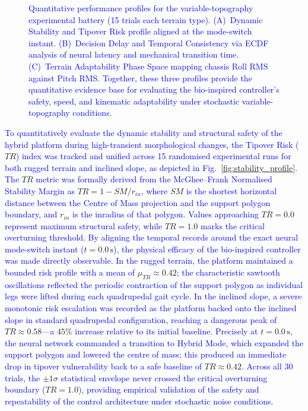 \documentclass[preprint,12pt]{elsarticle}
\newcommand{\revblue}[1]{\textcolor{blue}{#1}}
\begin{document}
\begin{figure}[t]
\begin{subfigure}[t]{0.32\textwidth}
        \label{fig:terrain_adaptability}
    \end{subfigure}
    \caption{\revblue{Quantitative performance profiles for the variable-topography experimental battery (15 trials each terrain type). (A)~Dynamic Stability and Tipover Risk profile aligned at the mode-switch instant. (B)~Decision Delay and Temporal Consistency via ECDF analysis of neural latency and mechanical transition time. (C)~Terrain Adaptability Phase Space mapping chassis Roll RMS against Pitch RMS. Together, these three profiles provide the quantitative evidence base for evaluating the bio-inspired controller's safety, speed, and kinematic adaptability under stochastic variable-topography conditions.}}
    \label{fig:variable_topo_metrics}
\end{figure}

\revblue{To quantitatively evaluate the dynamic stability and structural safety of the hybrid platform during high-transient morphological changes, the Tipover Risk (}$TR$\revblue{) index was tracked and unified across 15 randomised experimental runs for both rugged terrain and inclined slope, as depicted in Fig.}~\ref{fig:stability_profile}\revblue{. The} $TR$ \revblue{metric was formally derived from the McGhee--Frank Normalised Stability Margin as} $TR = 1 - SM/r_{in}$\revblue{, where} $SM$ \revblue{is the shortest horizontal distance between the Centre of Mass projection and the support polygon boundary, and} $r_{in}$ \revblue{is the inradius of that polygon. Values approaching} $TR = 0.0$ \revblue{represent maximum structural safety, while} $TR = 1.0$ \revblue{marks the critical overturning threshold. By aligning the temporal records around the exact neural mode-switch instant (}$t = 0.0\,\text{s}$\revblue{), the physical efficacy of the bio-inspired controller was made directly observable. In the rugged terrain, the platform maintained a bounded risk profile with a mean of} $\mu_{TR} \approx 0.42$\revblue{; the characteristic sawtooth oscillations reflected the periodic contraction of the support polygon as individual legs were lifted during each quadrupedal gait cycle. In the inclined slope, a severe monotonic risk escalation was recorded as the platform backed onto the inclined slope in standard quadrupedal configuration, reaching a dangerous peak of} $TR \approx 0.58$\revblue{---a} $45\%$ \revblue{increase relative to its initial baseline. Precisely at} $t = 0.0\,\text{s}$\revblue{, the neural network commanded a transition to Hybrid Mode, which expanded the support polygon and lowered the centre of mass; this produced an immediate drop in tipover vulnerability back to a safe baseline of} $TR \approx 0.42$\revblue{. Across all 30 trials, the} $\pm 1\sigma$ \revblue{statistical envelope never crossed the critical overturning boundary (}$TR = 1.0$\revblue{), providing empirical validation of the safety and repeatability of the control architecture under stochastic noise conditions.}
\end{document}
